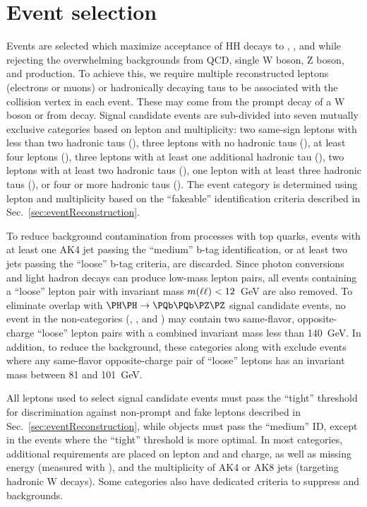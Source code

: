 \section{Event selection}
\label{sec:eventSelection}

Events are selected which maximize acceptance of HH decays to \WWWW, \WWtt, and
\tttt while rejecting the overwhelming backgrounds from QCD, single W
boson, Z boson, and \ttbar production.  To achieve this, we require multiple
reconstructed leptons \lep (electrons or muons) or hadronically decaying taus
\tauh to be associated with the collision vertex in each event.  These may come
from the prompt decay of a W boson or from \Pgt decay.  Signal candidate events
are sub-divided into seven mutually exclusive categories based on lepton and \tauh
multiplicity: two same-sign leptons with less than two hadronic taus (\llss),
three leptons with no hadronic taus (\lllnot), at least four leptons (\llll),
three leptons with at least one additional hadronic tau (\lllt), two
leptons with at least two hadronic taus (\lltt), one lepton with at least
three hadronic taus (\lttt), or four or more hadronic taus (\noltttt).
The event category is determined using lepton and \tauh multiplicity based on the
``fakeable'' identification criteria described in Sec.~\ref{sec:eventReconstruction}.

To reduce background contamination from processes with top quarks, events with
at least one AK4 jet passing the ``medium'' b-tag identification, or at least two
jets passing the ``loose'' b-tag criteria, are discarded.  Since photon conversions
and light hadron decays can produce low-mass lepton pairs, all events containing a
``loose'' lepton pair with invariant mass $m(\ell\ell) < 12$~GeV are also removed.
To eliminate overlap with $\HH \to \PQb\PQb\PZ\PZ$ signal candidate events, no event in the
non-\tauh categories (\llss, \lllnot, and \llll) may contain two same-flavor,
opposite-charge ``loose'' lepton pairs with a combined invariant mass less than 140~GeV.
In addition, to reduce the \Zll background, these categories along with
\lltt exclude events where any same-flavor opposite-charge pair of ``loose''
leptons has an invariant mass between 81 and 101~GeV.


All leptons used to select signal candidate events must pass the ``tight'' threshold
for discrimination against non-prompt and fake leptons described in
Sec.~\ref{sec:eventReconstruction}, while \tauh objects must pass the ``medium'' ID,
except in the \lllt events where the ``tight'' threshold is more optimal. 
In most categories, additional requirements are placed on lepton and \tauh \pt
and charge, as well as missing energy (measured with \metLD), and the multiplicity
of AK4 or AK8 jets (targeting hadronic W decays).  Some categories also have dedicated
criteria to suppress \Zll and \Ztt backgrounds.

